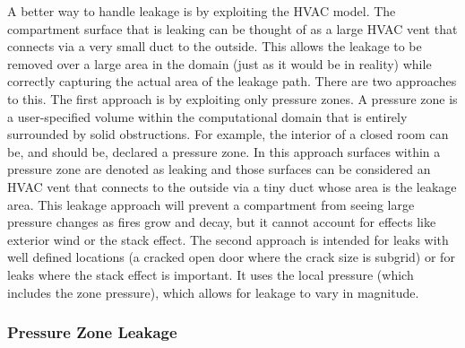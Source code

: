\documentclass[11pt]{book}
\begin{document}
A better way to handle leakage is by exploiting the HVAC model. The compartment surface that is leaking can be thought of as a large HVAC vent that connects via a very small duct to the outside. This allows the leakage to be removed over a large area in the domain (just as it would be in reality) while correctly capturing the actual area of the leakage path. There are two approaches to this.  The first approach is by exploiting only pressure zones.  A pressure zone is a user-specified volume within the computational domain that is
entirely surrounded by solid obstructions. For example, the interior of a closed room can be, and should be, declared a pressure zone. In this approach surfaces within a pressure zone are denoted as leaking and those surfaces can be considered an HVAC vent that connects to the outside via a tiny duct whose area is the leakage area. This leakage approach will prevent a compartment from seeing large pressure changes as fires grow and decay, but it cannot account for effects like exterior wind or the stack effect. The second approach is intended for leaks with well defined locations (a cracked open door where the crack size is subgrid) or for leaks where the stack effect is important. It uses the local pressure (which includes the zone pressure), which allows for leakage to vary in magnitude.

\subsubsection{Pressure Zone Leakage}
\label{info:zone_leakage}
\end{document}

